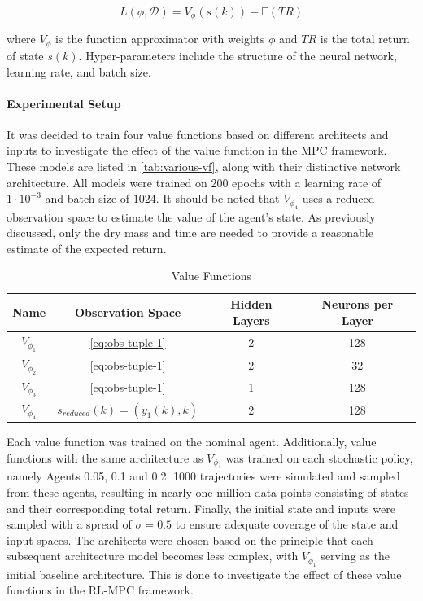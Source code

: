 \begin{equation}\label{eq:vf_tr_loss}
    L(\phi, \mathcal{D}) =   V_{\phi}(s(k)) - \mathbb{E}(TR)
\end{equation}

where $V_{\phi}$ is the function approximator with weights $\phi$ and $TR$ is the total return of state $s(k)$. Hyper-parameters include the structure of the neural network, learning rate, and batch size.\\



\paragraph{Experimental Setup}
It was decided to train four value functions based on different architects and inputs to investigate the effect of the value function in the MPC framework. These models are listed in \autoref{tab:various-vf}, along with their distinctive network architecture. All models were trained on 200 epochs with a learning rate of $1 \cdot 10^{-3}$ and batch size of $1024$. It should be noted that $V_{\phi_4}$ uses a reduced observation space to estimate the value of the agent's state. As previously discussed, only the dry mass and time are needed to provide a reasonable estimate of the expected return.

\begin{table}[H]
	\centering
	\renewcommand{\arraystretch}{1.3}
	\setlength{\tabcolsep}{12pt}
	\begin{tabular}{cccc}
		\toprule
		\textbf{Name} & \textbf{Observation Space} & \textbf{Hidden Layers} & \textbf{Neurons per Layer} \\
		\midrule
		$V_{\phi_1}$ & \autoref{eq:obs-tuple-1} & 2 & 128 \\  
		$V_{\phi_2}$ & \autoref{eq:obs-tuple-1} & 2 & 32 \\  
		$V_{\phi_3}$ & \autoref{eq:obs-tuple-1} & 1 & 128 \\  
		$V_{\phi_4}$ & $s_{reduced}(k)=(y_1(k), k)$ & 2 & 128 \\  
		\bottomrule
	\end{tabular}
	\caption{Value Functions}
	\label{tab:various-vf}
\end{table}

Each value function was trained on the nominal agent. Additionally, value functions with the same architecture as $V_{\phi_4}$ was trained on each stochastic policy, namely Agents 0.05, 0.1 and 0.2. 1000 trajectories were simulated and sampled from these agents, resulting in nearly one million data points consisting of states and their corresponding total return. Finally, the initial state and inputs were sampled with a spread of $\sigma = 0.5$ to ensure adequate coverage of the state and input spaces. The architects were chosen based on the principle that each subsequent architecture model becomes less complex, with $V_{\phi_1}$ serving as the initial baseline architecture. This is done to investigate the effect of these value functions in the RL-MPC framework.

